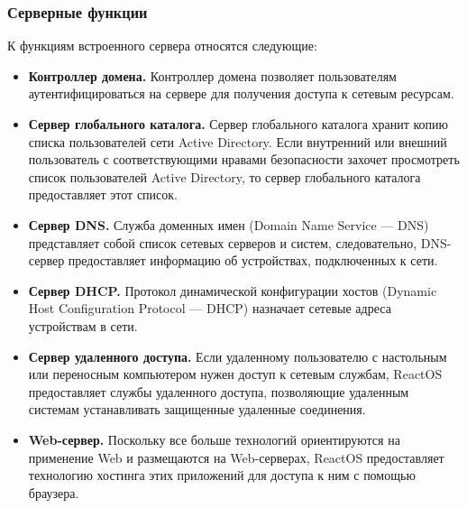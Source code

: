 \subsubsection{Серверные функции}
К функциям встроенного сервера относятся следующие:
\begin{itemize}
\item \textbf{Контроллер домена.} Контроллер домена позволяет пользователям аутентифицироваться на сервере для получения доступа к сетевым ресурсам.
\item \textbf{Сервер глобального каталога.} Сервер глобального каталога хранит копию списка пользователей сети Active Directory. Если внутренний или внешний пользователь с соответствующими нравами безопасности захочет просмотреть список пользователей Active Directory, то сервер глобального каталога предоставляет этот список.
\item \textbf{Сервер DNS.} Служба доменных имен (Domain Name Service — DNS) представляет собой список сетевых серверов и систем, следовательно, DNS-сервер предоставляет информацию об устройствах, подключенных к сети.
\item \textbf{Сервер DHCP.} Протокол динамической конфигурации хостов (Dynamic Host Configuration Protocol — DHCP) назначает сетевые адреса устройствам в сети.
\item \textbf{Сервер удаленного доступа.} Если удаленному пользователю с настольным или переносным компьютером нужен доступ к сетевым службам, ReactOS предоставляет службы удаленного доступа, позволяющие удаленным системам устанавливать защищенные удаленные соединения.
\item \textbf{Web-сервер.} Поскольку все больше технологий ориентируются на применение Web и размещаются на Web-серверах, ReactOS предоставляет технологию хостинга этих приложений для доступа к ним с помощью браузера.
\end{itemize}




